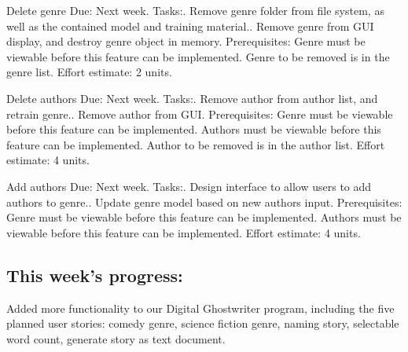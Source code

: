 \documentclass[12pt]{article}
\begin{document}
Delete genre\newline
Due: Next week.\newline
Tasks:. Remove genre folder from file system, as well as the contained model and
training material.. Remove genre from GUI display, and destroy genre object in memory.\newline
Prerequisites:\newline
Genre must be viewable before this feature can be implemented.\newline
Genre to be removed is in the genre list.\newline
Effort estimate: 2 units.

Delete authors\newline
Due: Next week.\newline
Tasks:. Remove author from author list, and retrain genre.. Remove author from GUI.\newline
Prerequisites:\newline
Genre must be viewable before this feature can be implemented.\newline
Authors must be viewable before this feature can be implemented.\newline
Author to be removed is in the author list.\newline
Effort estimate: 4 units.

Add authors\newline
Due: Next week.\newline
Tasks:. Design interface to allow users to add authors to genre.. Update genre model based on new authors input.\newline
Prerequisites:\newline
Genre must be viewable before this feature can be implemented.\newline
Authors must be viewable before this feature can be implemented.\newline
Effort estimate: 4 units.

\subsection{This week's progress:}
Added more functionality to our Digital Ghostwriter program, including the five planned user stories: comedy genre, science fiction genre,  naming story, selectable word count, generate story as text document. 
\end{document}
